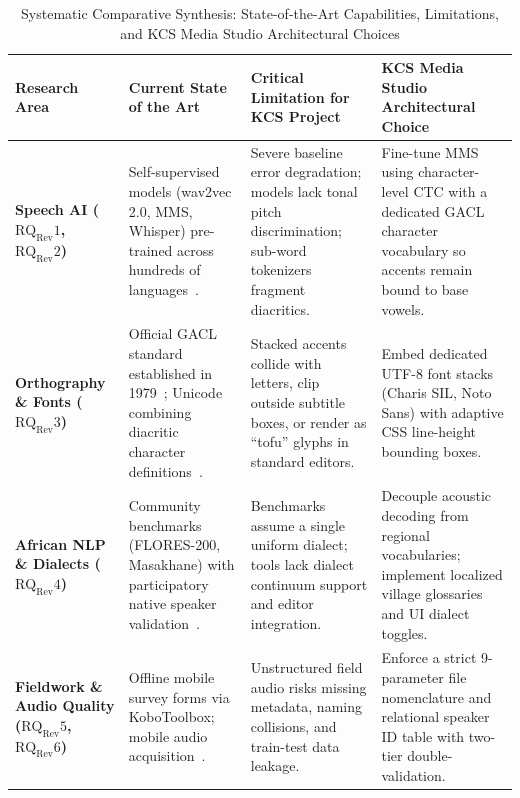 \documentclass[a4paper,11pt]{article}
\begin{document}
\begin{table}[t]
\centering
\small
\caption{Systematic Comparative Synthesis: State-of-the-Art Capabilities, Limitations, and KCS Media Studio Architectural Choices}
\label{tab:comparative_synthesis}
\begin{tabular}{>{\raggedright\arraybackslash}p{2.8cm} >{\raggedright\arraybackslash}p{4.2cm} >{\raggedright\arraybackslash}p{4.6cm} >{\raggedright\arraybackslash}p{4.8cm}}
\toprule
\textbf{Research Area} & \textbf{Current State of the Art} & \textbf{Critical Limitation for KCS Project} & \textbf{KCS Media Studio Architectural Choice} \\
\midrule
\textbf{Speech AI ($\text{RQ}_{\text{Rev}}1$, $\text{RQ}_{\text{Rev}}2$)} & Self-supervised models (wav2vec 2.0, MMS, Whisper) pre-trained across hundreds of languages~\cite{baevski2020wav2vec, pratap2024scaling, radford2023robust}. & Severe baseline error degradation; models lack tonal pitch discrimination; sub-word tokenizers fragment diacritics. & Fine-tune MMS using character-level CTC with a dedicated GACL character vocabulary so accents remain bound to base vowels. \\
\addlinespace
\textbf{Orthography \& Fonts ($\text{RQ}_{\text{Rev}}3$)} & Official GACL standard established in 1979~\cite{tadadjeu1979alphabet}; Unicode combining diacritic character definitions~\cite{unicode2024standard}. & Stacked accents collide with letters, clip outside subtitle boxes, or render as ``tofu'' glyphs in standard editors. & Embed dedicated UTF-8 font stacks (Charis SIL, Noto Sans) with adaptive CSS line-height bounding boxes. \\
\addlinespace
\textbf{African NLP \& Dialects ($\text{RQ}_{\text{Rev}}4$)} & Community benchmarks (FLORES-200, Masakhane) with participatory native speaker validation~\cite{nekoto2020participatory, goyal2022flores, adelani2022masakhaner}. & Benchmarks assume a single uniform dialect; tools lack dialect continuum support and editor integration. & Decouple acoustic decoding from regional vocabularies; implement localized village glossaries and UI dialect toggles. \\
\addlinespace
\textbf{Fieldwork \& Audio Quality ($\text{RQ}_{\text{Rev}}5$, $\text{RQ}_{\text{Rev}}6$)} & Offline mobile survey forms via KoboToolbox; mobile audio acquisition~\cite{bird2014aikuma, kobotoolbox2024}. & Unstructured field audio risks missing metadata, naming collisions, and train-test data leakage. & Enforce a strict 9-parameter file nomenclature and relational speaker ID table with two-tier double-validation. \\

\end{tabular}
\end{table}
\end{document}
